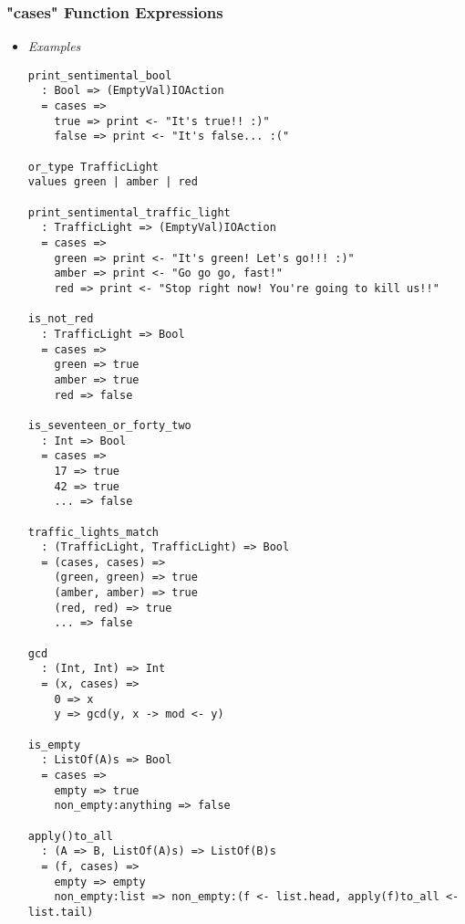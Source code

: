 \documentclass{article}
\begin{document}
\subsubsection{"cases" Function Expressions}
\label{subsubsec:casessyntax}

\begin{itemize}
\item \textit{Examples}

\begin{verbatim}
print_sentimental_bool
  : Bool => (EmptyVal)IOAction
  = cases =>
    true => print <- "It's true!! :)"
    false => print <- "It's false... :("

or_type TrafficLight
values green | amber | red

print_sentimental_traffic_light
  : TrafficLight => (EmptyVal)IOAction
  = cases =>
    green => print <- "It's green! Let's go!!! :)"
    amber => print <- "Go go go, fast!"
    red => print <- "Stop right now! You're going to kill us!!"

is_not_red
  : TrafficLight => Bool
  = cases =>
    green => true
    amber => true
    red => false

is_seventeen_or_forty_two
  : Int => Bool
  = cases => 
    17 => true
    42 => true
    ... => false
 
traffic_lights_match
  : (TrafficLight, TrafficLight) => Bool
  = (cases, cases) =>
    (green, green) => true
    (amber, amber) => true
    (red, red) => true
    ... => false

gcd
  : (Int, Int) => Int
  = (x, cases) =>
    0 => x
    y => gcd(y, x -> mod <- y) 

is_empty
  : ListOf(A)s => Bool
  = cases => 
    empty => true
    non_empty:anything => false

apply()to_all
  : (A => B, ListOf(A)s) => ListOf(B)s
  = (f, cases) =>
    empty => empty
    non_empty:list => non_empty:(f <- list.head, apply(f)to_all <- list.tail)

\end{verbatim}


\end{itemize}
\end{document}
